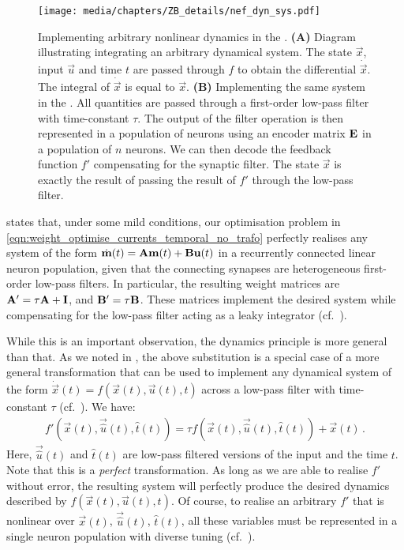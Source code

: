 \begin{figure}
	\centering
	\texttt{[image: media/chapters/ZB\_details/nef\_dyn\_sys.pdf]}%
	{\label{fig:nef_dyn_sys_a}}%
	{\label{fig:nef_dyn_sys_b}}%
	\caption[Implementing arbitrary nonlinear dynamics in the NEF]{
		Implementing arbitrary nonlinear dynamics in the \NEF.
		\textbf{(A)} Diagram illustrating integrating an arbitrary dynamical system. The state $\vec x$, input $\vec u$ and time $t$ are passed through $f$ to obtain the differential $\dot{\vec x}$. The integral of $\dot{\vec x}$ is equal to $\vec x$.
		\textbf{(B)} Implementing the same system in the \NEF. All quantities are passed through a first-order low-pass filter with time-constant $\tau$.
		The output of the filter operation is then represented in a population of neurons using an encoder matrix $\mathbf{E}$ in a population of $n$ neurons. We can then decode the feedback function $f'$ compensating for the synaptic filter. The state $\vec x$ is exactly the result of passing the result of $f'$ through the low-pass filter.
	}
	\label{fig:nef_dyn_sys}
\end{figure}

 states that, under some mild conditions, our optimisation problem in \cref{eqn:weight_optimise_currents_temporal_no_trafo} perfectly realises any \LTI system of the form $\dot{\mathbf{m}}(t) = \mathbf{A} \mathbf{m}(t) + \mathbf{B} \mathbf{u}(t)$ in a recurrently connected linear neuron population, given that the connecting synapses are heterogeneous first-order low-pass filters.
In particular, the resulting weight matrices are $\mathbf{A}' = \tau \mathbf{A} + \mathbf{I}$, and $\mathbf{B}' = \tau \mathbf{B}$.
These matrices implement the desired \LTI system while compensating for the low-pass filter acting as a leaky integrator (cf.~).

While this is an important observation, the \NEF dynamics principle is more general than that.
As we noted in , the above substitution is a special case of a more general transformation that can be used to implement any dynamical system of the form $\dot{\vec x}(t) = f(\vec x(t), \vec u(t), t)$ across a low-pass filter with time-constant $\tau$ (cf.~).
We have:
\begin{align}
	f'(\vec x(t), \vec{\hat u}(t), \hat t(t)) = \tau f(\vec x(t), \vec{\hat u}(t), \hat t(t)) + \vec x(t) \,.
	\label{eqn:nef_dynamics_general}
\end{align}
Here, $\vec{\hat u}(t)$ and $\hat t(t)$ are low-pass filtered versions of the input and the time $t$.
Note that this is a \emph{perfect} transformation.
As long as we are able to realise $f'$ without error, the resulting system will perfectly produce the desired dynamics described by $f(\vec x(t), \vec u(t), t)$.
Of course, to realise an arbitrary $f'$ that is nonlinear over $\vec x(t)$, $\vec{\hat u}(t)$, $\hat t(t)$, all these variables must be represented in a single neuron population with diverse tuning (cf.~).

